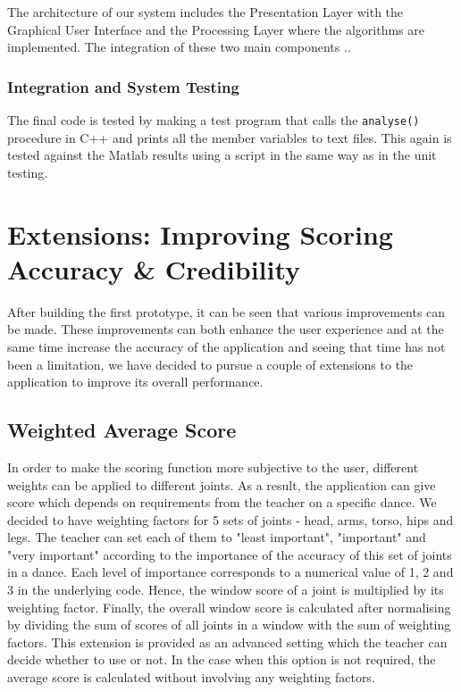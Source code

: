 \documentclass[11pt,a4paper]{article}
\begin{document}
\noindent
The architecture of our system includes the Presentation Layer with the Graphical User Interface and the Processing Layer where the algorithms are implemented. The integration of these two main components ..


\subsubsection{Integration and System Testing}
The final code is tested by making a test program that calls the \texttt{analyse()} procedure in C++ and prints all the member variables to text files. This again is tested against the Matlab results using a script in the same way as in the unit testing.

\clearpage
\section{Extensions: Improving Scoring Accuracy \& Credibility}
\noindent
After building the first prototype, it can be seen that various improvements can be made. These improvements can both enhance the user experience and at the same time increase the accuracy of the application and seeing that time has not been a limitation, we have decided to pursue a couple of extensions to the application to improve its overall performance.

\subsection{Weighted Average Score}
\noindent
In order to make the scoring function more subjective to the user, different weights can be applied to different joints. As a result, the application can give score which depends on requirements from the teacher on a specific dance. We decided to have weighting factors for 5 sets of joints - head, arms, torso, hips and legs. The teacher can set each of them to "least important", "important" and "very important" according to the importance of the accuracy of this set of joints in a dance. Each level of importance corresponds to a numerical value of 1, 2 and 3 in the underlying code. Hence, the window score of a joint is  multiplied by its weighting factor. Finally, the overall window score is calculated after  normalising by dividing the sum of scores of all joints in a window with the sum of weighting factors. This extension is provided as an advanced setting which the teacher can decide whether to use or not. In the case when this option is not required, the average score is calculated without involving any weighting factors. 
\end{document}
